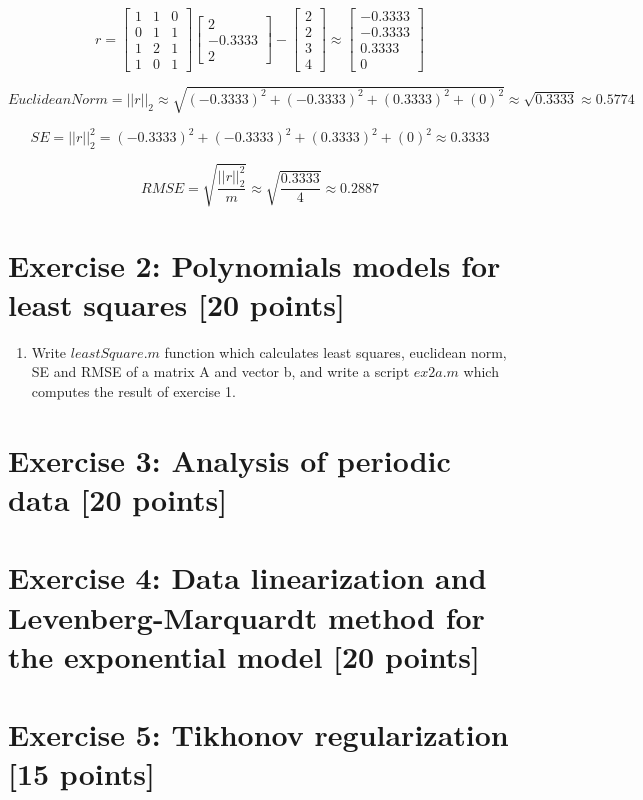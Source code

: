 \documentclass[unicode,11pt,a4paper,oneside,numbers=endperiod,openany]{scrartcl}
\newcommand{\norm}[1]{\lvert\lvert #1 \rvert\rvert}
\begin{document}
\begin{equation*}
 r = \begin{bmatrix}
1 & 1 & 0 \\
0 & 1 & 1 \\
1 & 2 & 1 \\
1 & 0 & 1
\end{bmatrix}
\begin{bmatrix}
        2 \\
        -0.3333 \\
        2
\end{bmatrix} -
\begin{bmatrix}
2 \\
2 \\
3 \\
4
\end{bmatrix} \approx
\begin{bmatrix}
-0.3333 \\
-0.3333 \\
0.3333 \\
0
\end{bmatrix}
\end{equation*}

\begin{equation*}
 EuclideanNorm = \norm{r}_2 \approx \sqrt{(-0.3333)^2 + (-0.3333)^2 + (0.3333)^2 + (0)^2} \approx \sqrt{0.3333} \approx 0.5774
\end{equation*}

\begin{equation*}
 SE = \norm{r}_2^2 = (-0.3333)^2 + (-0.3333)^2 + (0.3333)^2 + (0)^2 \approx 0.3333
\end{equation*}

\begin{equation*}
 RMSE = \sqrt{\frac{\norm{r}_2^2}{m}} \approx \sqrt{\frac{0.3333}{4}} \approx 0.2887
\end{equation*}

\section*{Exercise 2: Polynomials models for least squares [20 points]}

\begin{enumerate}[label=(\alph*)]
 \item Write ${leastSquare.m}$ function which calculates least squares, euclidean norm, SE and RMSE of a matrix A and vector b, and write a script ${ex2a.m}$ which computes the result of exercise 1.
\end{enumerate}



\section*{Exercise 3: Analysis of periodic data [20 points]}

\section*{Exercise 4: Data linearization and Levenberg-Marquardt method for the exponential model [20 points]}

\section*{Exercise 5: Tikhonov regularization [15 points]}
\end{document}
